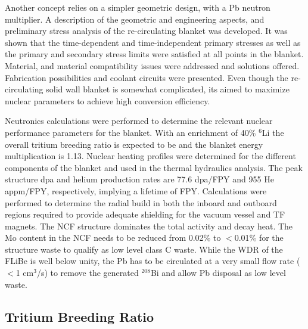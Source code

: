 Another concept relies on a simpler geometric design, with a \gls{Pb} neutron
multiplier.  A description of the geometric and engineering aspects, and
preliminary stress analysis of the re-circulating blanket was developed. It
was shown that the time-dependent and time-independent primary stresses as
well as the primary and secondary stress limits were satisfied at all points
in the blanket. Material, and material compatibility issues were addressed and
solutions offered. Fabrication possibilities and coolant circuits were
presented. Even though the re-circulating solid wall blanket is somewhat
complicated, its aimed to maximize nuclear parameters to achieve high
conversion efficiency.

Neutronics calculations were performed to determine the relevant nuclear
performance parameters for the blanket. With an enrichment of 40\% $^6$Li the
overall tritium breeding ratio is expected to be  and the
blanket energy multiplication is 1.13. Nuclear heating profiles were
determined for the different components of the blanket and used in the thermal
hydraulics analysis. The peak structure dpa and helium production rates are
77.6 dpa/FPY and 955 He appm/FPY, respectively, implying a lifetime of
 FPY. Calculations were performed to determine the radial build
in both the inboard and outboard regions required to provide adequate
shielding for the vacuum vessel and \gls{TF} magnets. The \gls{NCF} structure
dominates the total activity and decay heat. The Mo content in the \gls{NCF}
needs to be reduced from 0.02\% to $<$0.01\% for the structure waste to
qualify as low level class C waste.  While the \gls{WDR} of the FLiBe is well
below unity, the \gls{Pb} has to be circulated at a very small flow rate ($<$1
cm$^3$/s) to remove the generated $^{208}$Bi and allow \gls{Pb} disposal as
low level waste.


\subsection{Tritium Breeding Ratio}

